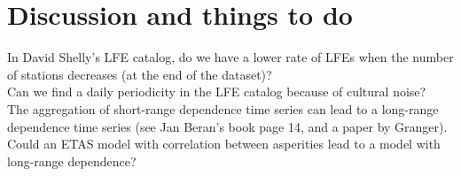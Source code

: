 \documentclass[main.tex]{subfiles}
\begin{document}
\chapter{Discussion and things to do}

In David Shelly's LFE catalog, do we have a lower rate of LFEs when the number of stations decreases (at the end of the dataset)? \\

Can we find a daily periodicity in the LFE catalog because of cultural noise? \\

The aggregation of short-range dependence time series can lead to a long-range dependence time series (see Jan Beran's book page 14, and a paper by Granger). Could an ETAS model with correlation between asperities lead to a model with long-range dependence?
\end{document}
